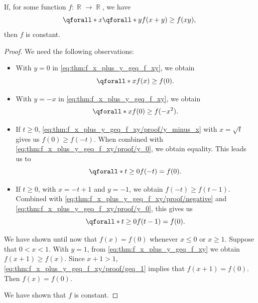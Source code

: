 \begin{proposition}\label{thm:f_x_plus_y_geq_f_xy}
  If, for some function \( f: \BbbR \to \BbbR \), we have
  \begin{equation}\label{eq:thm:f_x_plus_y_geq_f_xy}
    \qforall* x \qforall* y f(x + y) \geq f(xy),
  \end{equation}
  then \( f \) is constant.
\end{proposition}
\begin{proof}
  We need the following observations:
  \begin{itemize}
    \item With \( y = 0 \) in \eqref{eq:thm:f_x_plus_y_geq_f_xy}, we obtain
    \begin{equation}\label{eq:thm:f_x_plus_y_geq_f_xy/proof/y_0}
      \qforall* x f(x) \geq f(0).
    \end{equation}

    \item With \( y = -x \) in \eqref{eq:thm:f_x_plus_y_geq_f_xy}, we obtain
    \begin{equation}\label{eq:thm:f_x_plus_y_geq_f_xy/proof/y_minus_x}
      \qforall* x f(0) \geq f(-x^2).
    \end{equation}

    \item If \( t \geq 0 \), \eqref{eq:thm:f_x_plus_y_geq_f_xy/proof/y_minus_x} with \( x = \sqrt t \) gives us \( f(0) \geq f(-t) \). When combined with \eqref{eq:thm:f_x_plus_y_geq_f_xy/proof/y_0}, we obtain equality. This leads us to
    \begin{equation}\label{eq:thm:f_x_plus_y_geq_f_xy/proof/negative}
      \qforall* {t \geq 0} f(-t) = f(0).
    \end{equation}

    \item If \( t \geq 0 \), with \( x = -t + 1 \) and \( y = -1 \), we obtain \( f(-t) \geq f(t - 1) \). Combined with \eqref{eq:thm:f_x_plus_y_geq_f_xy/proof/negative} and \eqref{eq:thm:f_x_plus_y_geq_f_xy/proof/y_0}, this gives us
    \begin{equation}\label{eq:thm:f_x_plus_y_geq_f_xy/proof/geq_1}
      \qforall* {t \geq 0} f(t - 1) = f(0).
    \end{equation}
  \end{itemize}

  We have shown until now that \( f(x) = f(0) \) whenever \( x \leq 0 \) or \( x \geq 1 \). Suppose that \( 0 < x < 1 \). With \( y = 1 \), from \eqref{eq:thm:f_x_plus_y_geq_f_xy} we obtain \( f(x + 1) \geq f(x) \). Since \( x + 1 > 1 \), \eqref{eq:thm:f_x_plus_y_geq_f_xy/proof/geq_1} implies that \( f(x + 1) = f(0) \). Then \( f(x) = f(0) \).

  We have shown that \( f \) is constant.
\end{proof}

